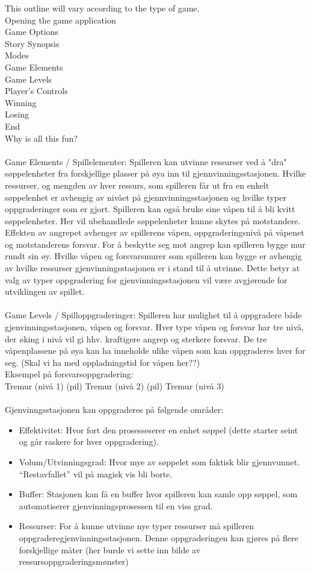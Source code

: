 This outline will vary according to the type of game. \\
Opening the game application\\
Game Options \\
Story Synopsis\\
Modes\\
Game Elements\\
Game Levels\\
Player’s Controls\\
Winning\\
Losing\\
End\\
Why is all this fun?\\
\\
Game Elements / Spillelementer: 
Spilleren kan utvinne ressurser ved å "dra" søppelenheter fra forskjellige plasser på øya inn til gjennvinningsstasjonen. Hvilke ressurser, og mengden av hver ressurs, som spilleren får ut fra en enkelt søppelenhet er avhengig av nivået på gjennvinningsstasjonen og hvilke typer oppgraderinger som er gjort. Spilleren kan også bruke sine våpen til å bli kvitt søppelenheter. Her vil ubehandlede søppelenheter kunne skytes på motstandere. Effekten av angrepet avhenger av spillerens våpen, oppgraderingsnivå på våpenet og motstanderens forsvar. For å beskytte seg mot angrep kan spilleren bygge mur rundt sin øy. Hvilke våpen og forsvarsmurer som spilleren kan bygge er avhengig av hvilke ressurser gjenvinningsstasjonen er i stand til å utvinne. Dette betyr at valg av typer oppgradering for gjenvinningsstasjonen vil være avgjørende for utviklingen av spillet.\\
\\
Game Levels / Spilloppgraderinger: 
Spilleren har mulighet til å oppgradere både gjenvinningsstasjonen, våpen og forsvar. Hver type våpen og forsvar har tre nivå, der øking i nivå vil gi hhv. kraftigere angrep og sterkere forsvar. De tre våpenplassene på øya kan ha inneholde ulike våpen som kan oppgraderes hver for seg. (Skal vi ha med oppladningstid for våpen her??)\\
Eksempel på forsvarsoppgradering:\\
Tremur (nivå 1) (pil) Tremur (nivå 2) (pil) Tremur (nivå 3)\\
\\
Gjenvinngsstasjonen kan oppgraderes på følgende områder:\\
\begin{itemize}
	\item Effektivitet: Hvor fort den prosesseserer en enhet søppel (dette starter seint og går raskere for hver oppgradering).
	\item Volum/Utvinningsgrad: Hvor mye av søppelet som faktisk blir gjennvunnet. “Restavfallet” vil på magisk vis bli borte.
	\item Buffer: Stasjonen kan få en buffer hvor spilleren kan samle opp søppel, som automatiserer gjenvinningsprosessen til en viss grad.
	\item Ressurser: For å kunne utvinne nye typer ressurser må spilleren oppgraderegjenvinningsstasjonen. Denne oppgraderingen kan gjøres på flere forskjellige måter (her burde vi sette inn bilde av ressursoppgraderingsmønster)
\end{itemize}

